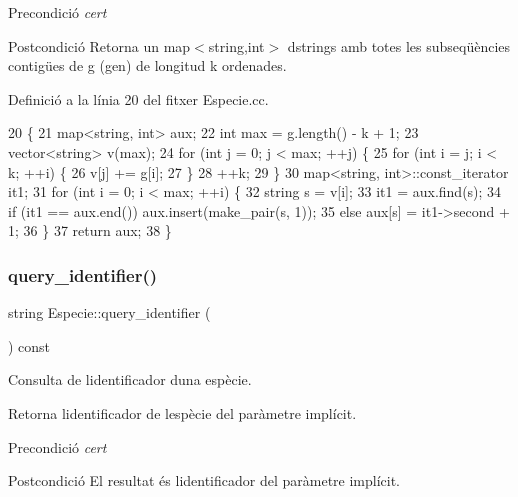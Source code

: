 \begin{DoxyPrecond}{Precondició}
{\itshape cert} 
\end{DoxyPrecond}
\begin{DoxyPostcond}{Postcondició}
Retorna un map$<$string,int$>$ d\textquotesingle{}strings amb totes les subseqüències contigües de g (gen) de longitud k ordenades. 
\end{DoxyPostcond}


Definició a la línia 20 del fitxer Especie.\+cc.


\begin{DoxyCode}
20                                                      \{
21     map<string, int> aux;
22     \textcolor{keywordtype}{int} max = g.length() - k + 1;
23     vector<string> v(max);
24     \textcolor{keywordflow}{for} (\textcolor{keywordtype}{int} j = 0; j < max; ++j) \{
25         \textcolor{keywordflow}{for} (\textcolor{keywordtype}{int} i = j; i < k; ++i) \{
26             v[j] += g[i];
27         \} 
28         ++k;
29     \}
30     map<string, int>::const\_iterator it1;
31     \textcolor{keywordflow}{for} (\textcolor{keywordtype}{int} i = 0; i < max; ++i) \{
32         \textcolor{keywordtype}{string} s = v[i];
33        it1 = aux.find(s);
34        \textcolor{keywordflow}{if} (it1 == aux.end()) aux.insert(make\_pair(s, 1));
35        \textcolor{keywordflow}{else} aux[s] = it1->second + 1;
36     \}
37     \textcolor{keywordflow}{return} aux;
38 \}
\end{DoxyCode}
\mbox{\label{class_especie_acfce0335ac5432dc681c2931b7986ace}} 
\subsubsection{\texorpdfstring{query\+\_\+identifier()}{query\_identifier()}}
{\footnotesize\ttfamily string Especie\+::query\+\_\+identifier (\begin{DoxyParamCaption}{ }\end{DoxyParamCaption}) const}



Consulta de l\textquotesingle{}identificador d\textquotesingle{}una espècie. 

Retorna l\textquotesingle{}identificador de l\textquotesingle{}espècie del paràmetre implícit.

\begin{DoxyPrecond}{Precondició}
{\itshape cert} 
\end{DoxyPrecond}
\begin{DoxyPostcond}{Postcondició}
El resultat és l\textquotesingle{}identificador del paràmetre implícit. 
\end{DoxyPostcond}


